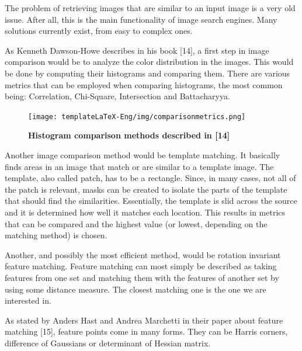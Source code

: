 \documentclass[12pt,a4paper,twoside]{report}
\begin{document}
The problem of retrieving images that are similar to an input image is a very old issue. After all, this is the main functionality of image search engines. Many solutions currently exist, from easy to complex ones. 

As Kenneth Dawson-Howe describes in his book [14], a first step in image comparison would be to analyze the color distribution in the images. This would be done by computing their histograms and comparing them. There are various metrics that can be employed when comparing histograms, the most common being: Correlation, Chi-Square, Intersection and Battacharyya.

\begin{figure}[H]
    \texttt{[image: templateLaTeX-Eng/img/comparisonmetrics.png]}
    \caption{\bf Histogram comparison methods described in [14]\footnotemark}
\end{figure}
Another image comparison method would be template matching. It basically finds areas in an image that match or are similar to a template image. The template, also called patch, has to be a rectangle. Since, in many cases, not all of the patch is relevant, masks can be created to isolate the parts of the template that should find the similarities. Essentially, the template is slid across the source and it is determined how well it matches each location. This results in metrics that can be compared and the highest value (or lowest, depending on the matching method) is chosen.
 
Another, and possibly the most efficient method, would be rotation invariant feature matching. Feature matching can most simply be described as taking features from one set and matching them with the features of another set by using some distance measure. The closest matching one is the one we are interested in.

As stated by Anders Hast and Andrea Marchetti in their paper about feature matching [15], feature points come in many forms. They can be Harris corners, difference of Gaussians or determinant of Hessian matrix.

 
 
\end{document}
